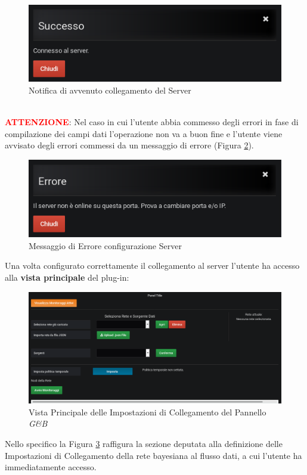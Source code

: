 \begin{figure}[H]
	\begin{center}
		\includegraphics[scale=0.6]{./images/NotificaServer.png}
		 \caption{Notifica di avvenuto collegamento del Server}	
		 \label{NotificaServer}
	\end{center}
\end{figure}

~\\
\textbf{\textcolor{red}{ATTENZIONE}}: Nel caso in cui l'utente abbia commesso degli errori in fase di compilazione dei campi dati l'operazione non va a buon fine e l'utente viene avvisato degli errori commessi da un messaggio di errore (Figura \ref{ErroreServer}).

\begin{figure}[H]
	\begin{center}
		\includegraphics[scale=0.6]{./images/ErroreServer.png}
		 \caption{Messaggio di Errore configurazione Server}	
		 \label{ErroreServer}
	\end{center}
\end{figure}


Una volta configurato correttamente il collegamento al server l'utente ha accesso alla \textbf{vista principale} del plug-in:
\begin{figure}[H]
	\begin{center}
		\includegraphics[scale=0.4]{./images/Panel.png}
		 \caption{Vista Principale delle Impostazioni di Collegamento del Pannello \textit{G\&B}}	
		 \label{Pannello}
	\end{center}
\end{figure}

Nello specifico la Figura \ref{Pannello} raffigura la sezione deputata alla definizione delle Impostazioni di Collegamento della rete bayesiana al flusso dati, a cui l'utente ha immediatamente accesso.

